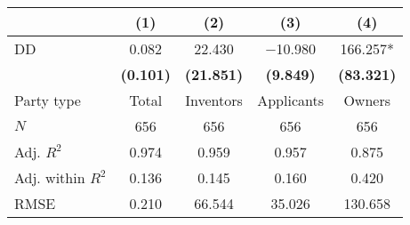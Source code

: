 
\begin{tabular}[t]{lcccc}
\toprule
  & (1) & (2) & (3) & (4)\\
\midrule
DD & \num{0.082} & \num{22.430} & \num{-10.980} & \num{166.257}*\\
\textbf{} & \textbf{(\num{0.101})} & \textbf{(\num{21.851})} & \textbf{(\num{9.849})} & \textbf{(\num{83.321})}\\
\midrule
Party type & Total & Inventors & Applicants & Owners\\
$N$ & \num{656} & \num{656} & \num{656} & \num{656}\\
Adj. $R^2$ & \num{0.974} & \num{0.959} & \num{0.957} & \num{0.875}\\
Adj. within $R^2$ & \num{0.136} & \num{0.145} & \num{0.160} & \num{0.420}\\
RMSE & \num{0.210} & \num{66.544} & \num{35.026} & \num{130.658}\\
\bottomrule
\end{tabular}
